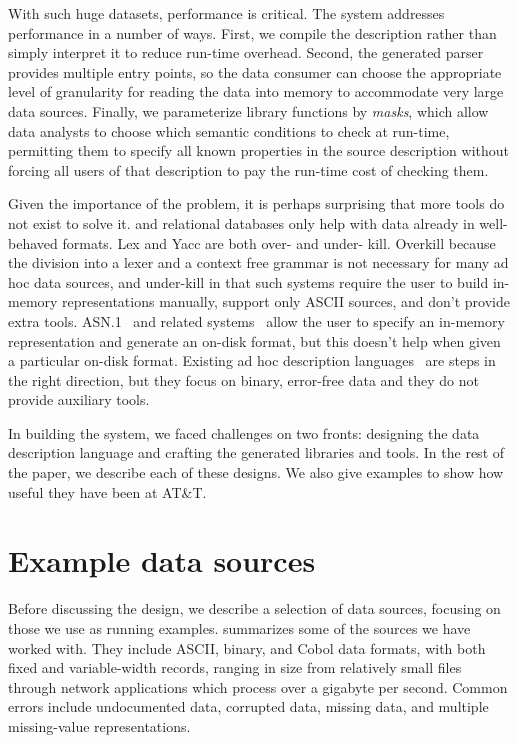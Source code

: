 \documentclass{sig-alternate}
\begin{document}
With such huge datasets, performance is critical. The \pads{} system addresses performance in a number of ways.
First, we compile the \pads{} description rather than simply interpret it to reduce run-time overhead.
Second, the generated parser provides  multiple entry points, so the data consumer can choose 
the appropriate level of granularity for reading the data into memory to accommodate very large data sources.
Finally, we parameterize library functions by \textit{masks}, which allow data analysts to 
choose which semantic conditions to check at run-time, permitting them to specify
all known properties in the source description without forcing all users of that 
description to pay the run-time cost of checking them.  

Given the importance of the problem, it is perhaps surprising
that more tools do not exist to solve it.  \xml{} and relational databases
only help with data already in well-behaved formats.  Lex and Yacc are both
over- and under- kill.  Overkill because the division into a lexer and a context free grammar is not necessary for many ad hoc data sources, and under-kill in that such systems require the user to build in-memory representations manually,
support only ASCII sources, and don't provide extra tools.  ASN.1~\cite{asn} and related systems~\cite{asdl} allow the user to specify an in-memory representation and generate an on-disk format, but this doesn't help when given a particular on-disk format.  
Existing ad hoc description languages~\cite{gpce02,sigcomm00,erlang} are steps 
in the right direction, but they focus on binary, error-free data and they do not provide auxiliary tools.

In building the \pads{} system, we faced challenges on two fronts:
designing the data description language and
crafting the generated libraries and tools.
In the rest of the paper, 
we describe each of these designs.
We also give examples to show how useful they have been at AT\&T.


\section{Example data sources}

Before discussing the \pads{} design, we describe a selection of data
sources, focusing on those we use as running examples.
 summarizes some of the sources we have
worked with.  They include ASCII, binary, and Cobol data formats, with
both fixed and variable-width records, ranging in size from
relatively small files through network applications which process over
a gigabyte per second.  Common errors include undocumented data,
corrupted data, missing data, and multiple missing-value
representations.
\end{document}
